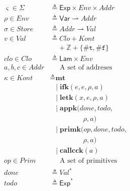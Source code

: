 \documentclass[12pt,draft]{article}
\newcommand{\truesyn}{\texttt{\#t}}
\newcommand{\falsesyn}{\texttt{\#f}}
\begin{document}
\begin{multicols*}{2}
\begin{align*}
\varsigma \in \Sigma &\triangleq \textsf{Exp} \times \textit{Env} \times \textit{Addr} \\
\rho \in \textit{Env} &\triangleq \textsf{Var} \rightharpoonup \textit{Addr} \\
\sigma \in \textit{Store} &\triangleq \textit{Addr} \rightharpoonup \textit{Val} \\
v \in \textit{Val} &\triangleq \textit{Clo} + \textit{Kont} \\
	& \;\;\;\; + \mathbb{Z} + \{\truesyn, \falsesyn\} \\
clo \in \textit{Clo} &\triangleq \textsf{Lam} \times \textit{Env} \\
a,b,c \in \textit{Addr} &\;\;\;\;\; \text{A set of addreses} \\
\kappa \in \textit{Kont} &\triangleq \textbf{mt} \\
        &\;\; \;|\; \textbf{ifk}(e, e, \rho, a) \\
        &\;\; \;|\; \textbf{letk}(x, e, \rho, a) \\
        &\;\; \;|\; \textbf{appk}(done, todo, \\
        &\;\;\;\;\;\;\;\;\;\;\;\;\;\;\;\;\;\rho, a) \\
        &\;\; \;|\; \textbf{primk}(op, done, todo, \\
        &\;\;\;\;\;\;\;\;\;\;\;\;\;\;\;\;\;\rho, a) \\
        &\;\; \;|\; \textbf{callcck}(a) \\
op \in \textit{Prim} &\;\;\;\;\; \text{A set of primitives} \\
done &\triangleq \textit{Val}^* \\
todo &\triangleq \textsf{Exp}^*
\end{align*}
\end{multicols*} %


\newpage



\end{document}
